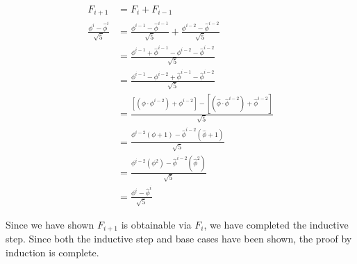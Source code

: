 \begin{align*}
	F_{i + 1} &= F_{i} + F_{i - 1} \\
	\frac{\phi^{i} - \hat{\phi}^{i}}{\sqrt{5}} 
	&=  
	\frac{\phi^{i - 1} - \hat{\phi}^{i - 1}}{\sqrt{5}} + 
	\frac{\phi^{i - 2} - \hat{\phi}^{i - 2}}{\sqrt{5}} \\
	&=
	\frac{\phi^{i - 1} + \hat{\phi}^{i - 1} - \phi^{i - 2} - \hat{\phi}^{i - 2}}{\sqrt{5}} \\
	&=
	\frac{\phi^{i - 1} - \phi^{i - 2} + \hat{\phi}^{i - 1} - \hat{\phi}^{i - 2}}{\sqrt{5}} \\
	&=
	\frac{\left[(\phi \cdot \phi^{i -2}) + \phi^{i - 2}\right] - \left[(\hat{\phi} \cdot \hat{\phi}^{i - 2}) + \hat{\phi}^{i - 2}\right]}{\sqrt{5}} \\
	&=
	\frac{\phi^{i - 2} \left( \phi + 1 \right) - \hat{\phi}^{i - 2} \left( \hat{\phi} + 1 \right)}{\sqrt{5}}\\
	&=
	\frac{\phi^{i - 2}\left( \phi^2 \right) - \hat{\phi}^{i - 2} \left( \hat{\phi}^2 \right)}{\sqrt{5}} \\
	&= 
	\frac{\phi^i - \hat{\phi}^i}{\sqrt{5}}
\end{align*}

Since we have shown $F_{i + 1}$ is obtainable via $F_i$, we have completed the inductive step. Since both the inductive step and base cases have been shown, the proof by induction is complete.
